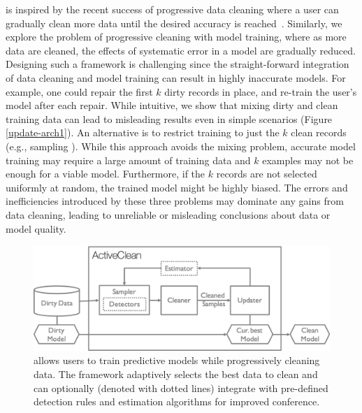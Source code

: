 \sys is inspired by the recent success of progressive data cleaning where a user can gradually clean more data until the desired accuracy is reached~\cite{altowim2014progressive, whang2014incremental, papenbrock2015progressive, gruenheid2014incremental, mayfield2010eracer, DBLP:journals/pvldb/YakoutENOI11, yakout2013don}.
Similarly, we explore the problem of progressive cleaning with model training, where as more data are cleaned, the effects of systematic error in a model are gradually reduced.
Designing such a framework is challenging since the straight-forward integration of data cleaning and model training can result in highly inaccurate models.
For example, one could repair the first $k$ dirty records in place, and re-train the user's model after each repair.
While intuitive, we show that mixing dirty and clean training data can lead to misleading results even in simple scenarios (Figure \ref{update-arch1}).
An alternative is to restrict training to just the $k$ clean records (e.g., sampling \cite{wang1999sample}).
While this approach avoids the mixing problem, accurate model training may require a large amount of training data and $k$ examples may not be enough for a viable model.
Furthermore, if the $k$ records are not selected uniformly at random, the trained model might be highly biased.
The errors and inefficiencies introduced by these three problems may dominate any gains from data cleaning, leading to unreliable or misleading conclusions about data or model quality.

\begin{figure}[t]
\centering
 \includegraphics[width=\columnwidth]{figs/arch.png}
 \caption{\sysfull allows users to train predictive models while progressively cleaning data. The framework adaptively selects the best data to clean and can optionally (denoted with dotted lines) integrate with pre-defined detection rules and estimation algorithms for improved conference. \label{sys-arch}}\vspace{-2em}
\end{figure}

